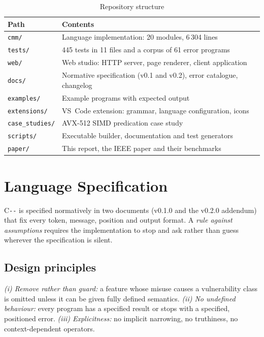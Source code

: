 \documentclass[conference]{IEEEtran}
\newcommand{\cmm}{C\texttt{-{}-}}
\begin{document}
\begin{table}[t]
\caption{Repository structure}
\label{tab:repo}
\centering
\footnotesize
\begin{tabular}{@{}l L{5.4cm}@{}}
\toprule
\textbf{Path} & \textbf{Contents} \\
\midrule
\texttt{cmm/} & Language implementation: 20 modules, 6\,304 lines \\
\texttt{tests/} & 445 tests in 11 files and a corpus of 61 error programs \\
\texttt{web/} & Web studio: HTTP server, page renderer, client application \\
\texttt{docs/} & Normative specification (v0.1 and v0.2), error catalogue, changelog \\
\texttt{examples/} & Example programs with expected output \\
\texttt{extensions/} & VS~Code extension: grammar, language configuration, icons \\
\texttt{case\_studies/} & AVX-512 SIMD predication case study \\
\texttt{scripts/} & Executable builder, documentation and test generators \\
\texttt{paper/} & This report, the IEEE paper and their benchmarks \\
\bottomrule
\end{tabular}
\end{table}

\section{Language Specification}\label{sec:lang}
\cmm{} is specified normatively in two documents (v0.1.0 and the v0.2.0 addendum) that fix every token,
message, position and output format. A \emph{rule against assumptions} requires the implementation to stop and
ask rather than guess wherever the specification is silent.

\subsection{Design principles}
\emph{(i) Remove rather than guard:} a feature whose misuse causes a vulnerability class is omitted unless it
can be given fully defined semantics. \emph{(ii) No undefined behaviour:} every program has a specified result
or stops with a specified, positioned error. \emph{(iii) Explicitness:} no implicit narrowing, no truthiness,
no context-dependent operators.
\end{document}
